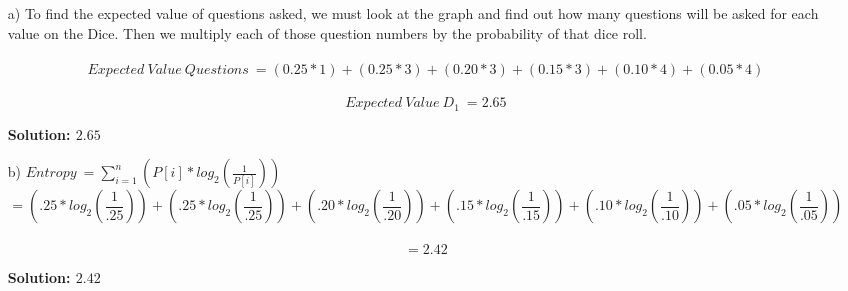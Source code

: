 \documentclass[11pt]{article}
\begin{document}
\begin{enumerate}
\item[a) ] To find the expected value of questions asked, we must look at the graph and find out how many questions will be asked for each value on the Dice.  Then we multiply each of those question numbers by the probability of that dice roll.\\ 
\\
$$Expected\ Value\ Questions\ = (0.25 * 1) + (0.25 * 3) + (0.20 * 3) + (0.15 * 3) + (0.10 * 4) + (0.05 * 4)$$
\\
$$Expected\ Value\ D_1\ = 2.65$$

\begin{center}
{\Large \textbf{Solution: $2.65$}}
\end{center}
\vspace{20 mm}
 \item[b) ] {\Large $Entropy\ = \sum\limits_{i=1}^n (P[i] * log_2(\frac{1}{P[i]}))$}\\
 $$= (.25 * log_2(\frac{1}{.25})) + (.25 * log_2(\frac{1}{.25})) + (.20 * log_2(\frac{1}{.20})) + (.15 * log_2(\frac{1}{.15})) + (.10 * log_2(\frac{1}{.10})) + (.05 * log_2(\frac{1}{.05}))$$
 \\
 $$ = 2.42$$
 \begin{center}
{ \Large \textbf{Solution: $2.42$}}
 \end{center}
\end{enumerate}
\end{document}
